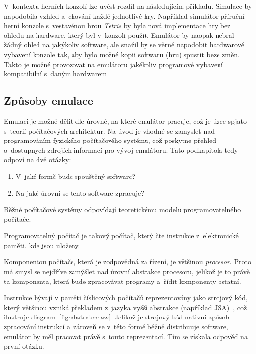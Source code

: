 \begin{example}
V~kontextu herních konzolí lze uvést rozdíl na následujícím příkladu. Simulace by napodobila vzhled a~chování každé jednotlivé hry. Například simulátor příruční herní konzole s~vestavěnou hrou \emph{Tetris} by byla nová implementace hry bez ohledu na hardware, který byl v~konzoli použit. Emulátor by naopak nebral žádný ohled na jakýkoliv software, ale snažil by se věrně napodobit hardwarové vybavení konzole tak, aby bylo možné kopii softwaru (hru) spustit beze změn. Takto je možné provozovat na emulátoru jakékoliv programové vybavení kompatibilní s~daným hardwarem \cite{FulberGarcia2022:simulation-emulation}
\end{example}

\subsection{Způsoby emulace}
Emulaci je možné dělit dle úrovně, na které emulátor pracuje, což je úzce spjato s~teorií počítačových architektur. Na úvod je vhodné se zamyslet nad programováním fyzického počítačového systému, což poskytne přehled o~dostupných zdrojích informací pro vývoj emulátoru. Tato podkapitola tedy odpoví na dvě otázky:
\begin{enumerate}
	\item V~jaké formě bude spouštěný software?
	\item Na jaké úrovni se tento software zpracuje?
\end{enumerate}

Běžné počítačové systémy odpovídají teoretickému modelu programovatelného počítače.

\begin{definition}
	Programovatelný počítač je takový počítač, který čte instrukce z~elektronické paměti, kde jsou uloženy.~\cite{Wikipedia:programovatelny-pocitac}
\end{definition}

Komponentou počítače, která je zodpovědná za řízení, je většinou \emph{procesor}. Proto má smysl se nejdříve zamýšlet nad úrovní abstrakce procesoru, jelikož je to právě ta komponenta, která bude zpracovávat programy a~řídit komponenty ostatní.

Instrukce bývají v paměti číslicových počítačů reprezentovány jako strojový kód, který většinou vzniká překladem z~jazyka vyšší abstrakce (například JSA)~\cite{Kubatova2018:SAP}, což ilustruje diagram~\ref{fig:abstrakce-sw}. Jelikož je strojový kód nativní způsob zpracování instrukcí a~zároveň se v~této formě běžně distribuuje software, emulátor by měl pracovat právě s~touto reprezentací. Tím se získala odpověď na první otázku.

